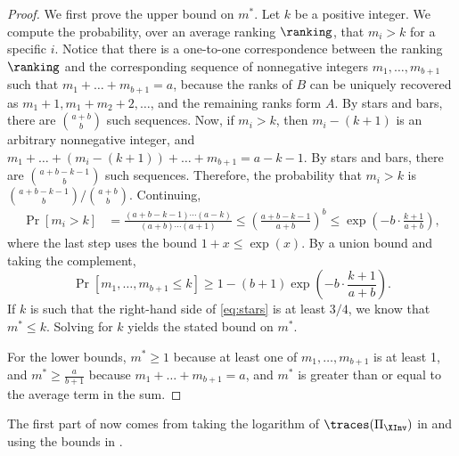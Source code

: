 \documentclass{toc}
\begin{document}
\begin{proof}
We first prove the upper bound on $m^*$. Let $k$ be a positive integer. We compute the probability, over an average ranking $\ranking$, that $m_i> k$ for a specific $i$. 
Notice that there is a one-to-one correspondence between the ranking $\ranking$ and the corresponding sequence of nonnegative integers $m_1,\dots,m_{b+1}$ such that $m_1+\dots+m_{b+1}=a$, because the ranks of $B$ can be uniquely recovered as $m_1+1,m_1+m_2+2,\dots$, and the remaining ranks form $A$. By stars and bars, there are $\binom{a+b}{b}$ such sequences. Now, if $m_i>k$, then $m_i-(k+1)$ is an arbitrary nonnegative integer, and $m_1+\dots+(m_i-(k+1))+\dots+m_{b+1}=a-k-1$. By stars and bars, there are $\binom{a+b-k-1}{b}$ such sequences. Therefore, the probability that $m_i>k$ is $\binom{a+b-k-1}{b}/\binom{a+b}{b}$. Continuing,
\begin{align*}
\Pr[m_i> k]&=\frac{(a+b-k-1)\cdots (a-k)}{(a+b)\cdots (a+1)}
        \le \left(\frac{a+b-k-1}{a+b}\right)^b
        \le \exp\left(-b\cdot \frac{k+1}{a+b} \right),
\end{align*}
where the last step uses the bound $1+x \le \exp(x)$.
By a union bound and taking the complement,
    \begin{equation}\label{eq:stars}
        \Pr[m_1,\dots,m_{b+1}\le k] \ge 1-(b+1)\exp\left(-b\cdot \frac{k+1}{a+b} \right).
    \end{equation}
If $k$ is such that the right-hand side of \eqref{eq:stars} is at least $3/4$, we know that $m^* \le k$. Solving for $k$ yields the stated bound on $m^*$.
    
For the lower bounds, $m^*\ge 1$ because at least one of $m_1,\dots,m_{b+1}$ is at least 1, and $m^*\ge \frac{a}{b+1}$ because $m_1+\dots+m_{b+1}=a$, and $m^*$ is greater than or equal to the average term in the sum.
\end{proof}

The first part of  now comes from taking the logarithm of $\traces(\Pi_{\XInv})$ in  and using the bounds in .
\end{document}
